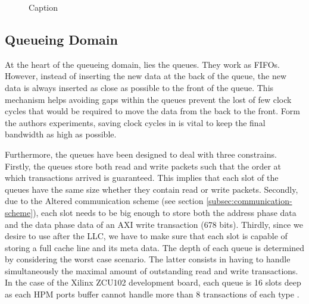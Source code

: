 \begin{figure}
  \centering
  
  \caption{Caption}
  \label{fig:SchIM_transaction_scheme_figure}
\end{figure}

\subsection{Queueing Domain}
At the heart of the queueing domain, lies the queues. They work as FIFOs. 
However, instead of inserting the new data at the back of the queue, 
the new data is always inserted as close as possible to the front of the 
queue. This mechanism helps avoiding gaps within the queues prevent the 
lost of few clock cycles that would be required to move the data from 
the back to the front. Form the authors experiments, saving clock cycles 
in \schim is vital to keep the final bandwidth as high as possible.

Furthermore, the queues have been designed to deal with three constrains.
Firstly, the queues store both read and write packets such that the order 
at which transactions arrived is guaranteed. This implies that each slot 
of the queues have the same size whether they contain read or write packets.
Secondly, due to the Altered communication scheme (see section 
\ref{subsec:communication-scheme}), each slot needs to be big enough to 
store both the address phase data and the data phase data of an AXI write 
transaction (678 bits).
Thirdly, since we desire to use \schim after the LLC, we have to make sure 
that each slot is capable of storing a full cache line and its meta data. 
The depth of each queue is determined by considering the worst case scenario. 
The latter consists in having to handle simultaneously the maximal amount of 
outstanding read and write transactions. In the case of the Xilinx ZCU102 
development board, each queue is 16 slots deep as each HPM ports buffer 
cannot handle more than 8 transactions of each type \cite{Xilinx-ULTRASCALE-TRM}.

